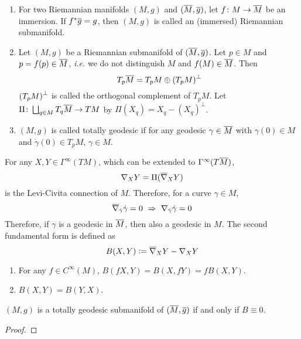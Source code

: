 \begin{enumerate}[label=\arabic{*}.]
	\begin{defn}
		\begin{enumerate}[label=(\arabic{*})]
			\item For two Riemannian manifolds $(M,g)$ and $(\overline{M},\overline{g})$, let $f \colon M \rightarrow \overline{M}$ be an immersion. If $f^*\overline{g} = g$, then $(M,g)$ is called an (immersed) Riemannian submanifold.
			\item  Let $(M,g)$ be a Riemannian submanifold of $(\overline{M},\overline{g})$. Let $p \in M$ and $p = f(p) \in \overline{M}$, \emph{i.e.} we do not distinguish $M$ and $f(M) \in \overline{M}$. Then
			\begin{equation*}
				T_{p}\overline{M} = T_pM \oplus \left(T_pM\right)^\perp
			\end{equation*}
			$\left(T_pM\right)^\perp$ is called the orthogonal complement of $T_pM$. Let $\Pi \colon \bigsqcup_{q \in M}T_q\overline{M} \rightarrow TM$ by $\Pi(X_q) =X_q- (X_q)^\perp$.
			\item $(M,g)$ is called totally geodesic if for any geodesic $\gamma \in \overline{M}$ with $\gamma(0) \in M$ and $\dot{\gamma}(0) \in T_pM$, $\gamma \in M$.
		\end{enumerate}
	\end{defn}
	For any $X,Y \in \Gamma^\infty(TM)$, which can be extended to $\Gamma^\infty(T\overline{M})$,
	\begin{equation*}
		\nabla_XY = \Pi(\overline{\nabla}_XY) 
	\end{equation*}
	is the Levi-Civita connection of $M$. Therefore, for a curve $\gamma \in M$,
	\begin{equation*}
		\overline{\nabla}_{\dot{\gamma}}\dot{\gamma} = 0 ~\Rightarrow~\nabla_{\dot{\gamma}}\dot{\gamma} = 0
	\end{equation*}
	Therefore, if $\gamma$ is a geodesic in $\overline{M}$, then also a geodesic in $M$. The second fundamental form is defined as
	\begin{equation*}
		B(X,Y) \vcentcolon= \overline{\nabla}_XY -\nabla_XY
	\end{equation*}
	\begin{enumerate}[label=(\arabic{*})]
		\item For any $f \in C^\infty(M)$, $B(fX,Y) = B(X,fY) = fB(X,Y)$.
		\item $B(X,Y) = B(Y,X)$.
	\end{enumerate}
	\begin{thm}\label{thm:totalgeo}
		$(M,g)$ is a totally geodesic  submanifold of $(\overline{M},\overline{g})$ if and only if $B \equiv 0$.
	\end{thm}
	\begin{proof}

\end{proof}
\end{enumerate}

